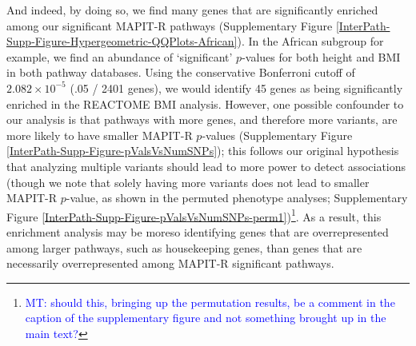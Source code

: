 \documentclass[12pt,a4paper]{article}
\begin{document}
And indeed, by doing so, we find many genes that are significantly enriched among our significant MAPIT-R pathways (Supplementary Figure \ref{InterPath-Supp-Figure-Hypergeometric-QQPlots-African}). In the African subgroup for example, we find an abundance of `significant' $p$-values for both height and BMI in both pathway databases. Using the conservative Bonferroni cutoff of $2.082\times10^{-5}$ (.05 / 2401 genes), we would identify 45 genes as being significantly enriched in the REACTOME BMI analysis. However, one possible confounder to our analysis is that pathways with more genes, and therefore more variants, are more likely to have smaller MAPIT-R $p$-values (Supplementary Figure \ref{InterPath-Supp-Figure-pValsVsNumSNPs}); this follows our original hypothesis that analyzing multiple variants should lead to more power to detect associations (though we note that solely having more variants does not lead to smaller MAPIT-R $p$-value, as shown in the permuted phenotype analyses; Supplementary Figure \ref{InterPath-Supp-Figure-pValsVsNumSNPs-perm1})\footnote{\textcolor{blue}{MT: should this, bringing up the permutation results, be a comment in the caption of the supplementary figure and not something brought up in the main text?}}. As a result, this enrichment analysis may be moreso identifying genes that are overrepresented among larger pathways, such as housekeeping genes, than genes that are necessarily overrepresented among MAPIT-R significant pathways. 
\end{document}
